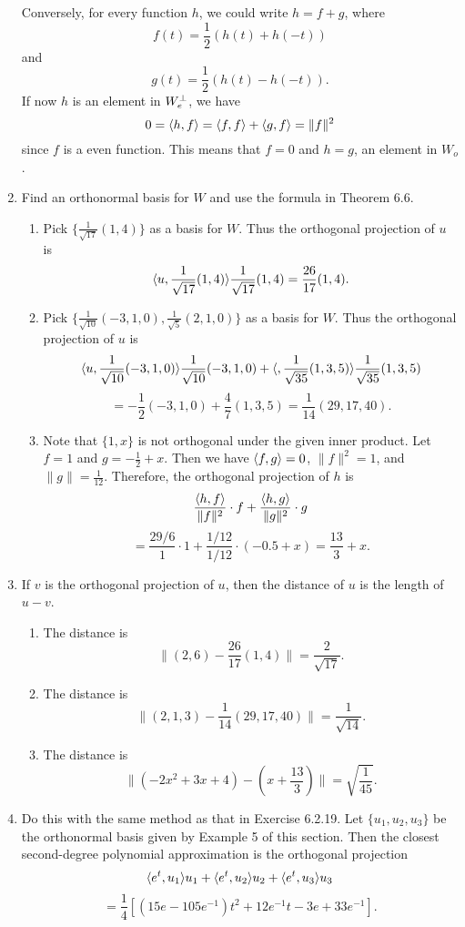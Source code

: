 \begin{enumerate}
Conversely, for every function $h$, we could write $h=f+g$, where 
\[f(t)=\frac{1}{2}(h(t)+h(-t))\] and 
\[g(t)=\frac{1}{2}(h(t)-h(-t)).\]
If now $h$ is an element in $W_e^{\perp}$, we have 
\[0=\langle h,f\rangle =\langle f,f\rangle +\langle g,f\rangle=\|f\|^2\]
since $f$ is a even function. This means that $f=0$ and $h=g$, an element in $W_o$.
\item Find an orthonormal basis for $W$ and use the formula in Theorem 6.6.
\begin{enumerate}
\item Pick $\{\frac{1}{\sqrt{17}}(1,4)\}$ as a basis for $W$. Thus the orthogonal projection of $u$ is 
\[\langle u,\frac{1}{\sqrt{17}}(1,4)\rangle \frac{1}{\sqrt{17}}(1,4)=\frac{26}{17}(1,4).\]
\item Pick $\{\frac{1}{\sqrt{10}}(-3,1,0),\frac{1}{\sqrt{5}}(2,1,0)\}$ as a basis for $W$. Thus the orthogonal projection of $u$ is 
\[\langle u,\frac{1}{\sqrt{10}}(-3,1,0)\rangle \frac{1}{\sqrt{10}}(-3,1,0)+\langle,\frac{1}{\sqrt{35}}(1,3,5)\rangle \frac{1}{\sqrt{35}}(1,3,5)\]
\[=-\frac{1}{2}(-3,1,0)+\frac{4}{7}(1,3,5)=\frac{1}{14}(29,17,40).\]
\item Note that $\{1, x\}$ is not orthogonal under the given inner product.  Let $f = 1$ and $g = -\frac{1}{2} + x$.  Then we have $\langle f,g\rangle = 0$, $\|f\|^2 = 1$, and $\|g\| = \frac{1}{12}$.  Therefore, the orthogonal projection of $h$ is 
\[\frac{\langle h,f\rangle}{\|f\|^2} \cdot f + \frac{\langle h,g\rangle}{\|g\|^2} \cdot g\]
\[=\frac{29/6}{1}\cdot 1 + \frac{1/12}{1/12}\cdot(-0.5 + x) = \frac{13}{3} + x.\]
\end{enumerate}
\item If $v$ is the orthogonal projection of $u$, then the distance of $u$ is the length of $u-v$.
\begin{enumerate}
\item The distance is 
\[\|(2,6)-\frac{26}{17}(1,4)\|=\frac{2}{\sqrt{17}}.\]
\item The distance is 
\[\|(2,1,3)-\frac{1}{14}(29,17,40)\|=\frac{1}{\sqrt{14}}.\]
\item The distance is 
\[\|(-2x^2+3x+4) - (x + \frac{13}{3})\|=\sqrt{\frac{1}{45}}.\]
\end{enumerate}
\item Do this with the same method as that in Exercise 6.2.19. Let $\{u_1,u_2,u_3\}$ be the orthonormal basis given by Example 5 of this section. Then the closest second-degree polynomial approximation is the orthogonal projection 
\[\langle e^t,u_1\rangle u_1+\langle e^t,u_2\rangle u_2+\langle e^t,u_3\rangle u_3\]
\[=\frac{1}{4}[(15e-105e^{-1})t^2+12e^{-1}t-3e+33e^{-1}].\]

\end{enumerate}
